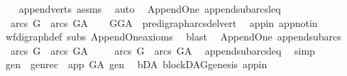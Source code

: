 \begin{isabellebody}
%
\isadelimproof
\ \ %
\endisadelimproof
%
\isatagproof
{}\isamarkupfalse%
\ append{\isacharunderscore}{\kern0pt}verts\ assms\ \isamarkupfalse%
\ auto%
\endisatagproof
{\isafoldproof}%
%
\isadelimproof
\isanewline
%
\endisadelimproof
\isanewline
{}\isamarkupfalse%
\ {\isacharparenleft}{\kern0pt}\ Append{\isacharunderscore}{\kern0pt}One{\isacharparenright}{\kern0pt}\ append{\isacharunderscore}{\kern0pt}subarcs{\isacharunderscore}{\kern0pt}leq{\isacharcolon}{\kern0pt}\ \isanewline
\ \ {\isachardoublequoteopen}arcs\ G\ {\isasymsubseteq}\ arcs\ G{\isacharunderscore}{\kern0pt}A{\isachardoublequoteclose}\isanewline
%
\isadelimproof
\ \ %
\endisadelimproof
%
\isatagproof
{}\isamarkupfalse%
\ GG{\isacharunderscore}{\kern0pt}A\ \ pre{\isacharunderscore}{\kern0pt}digraph{\isachardot}{\kern0pt}arcs{\isacharunderscore}{\kern0pt}del{\isacharunderscore}{\kern0pt}vert\ \isamarkupfalse%
\ app{\isacharunderscore}{\kern0pt}in\ app{\isacharunderscore}{\kern0pt}notin\ \isanewline
\ \ \isamarkupfalse%
\ wf{\isacharunderscore}{\kern0pt}digraph{\isacharunderscore}{\kern0pt}def\ subs\ Append{\isacharunderscore}{\kern0pt}One{\isacharunderscore}{\kern0pt}axioms\ \isamarkupfalse%
\ blast%
\endisatagproof
{\isafoldproof}%
%
\isadelimproof
\isanewline
%
\endisadelimproof
\isanewline
{}\isamarkupfalse%
\ {\isacharparenleft}{\kern0pt}\ Append{\isacharunderscore}{\kern0pt}One{\isacharparenright}{\kern0pt}\ append{\isacharunderscore}{\kern0pt}subarcs{\isacharcolon}{\kern0pt}\ \isanewline
\ \ {\isachardoublequoteopen}arcs\ G\ {\isasymsubset}\ arcs\ G{\isacharunderscore}{\kern0pt}A{\isachardoublequoteclose}\isanewline
%
\isadelimproof
%
\endisadelimproof
%
\isatagproof
{}\isamarkupfalse%
\isanewline
\ \ \isamarkupfalse%
\ \ {\isachardoublequoteopen}arcs\ G\ {\isasymsubseteq}\ arcs\ G{\isacharunderscore}{\kern0pt}A{\isachardoublequoteclose}\ \isamarkupfalse%
\ append{\isacharunderscore}{\kern0pt}subarcs{\isacharunderscore}{\kern0pt}leq\ \isamarkupfalse%
\ simp\isanewline
\ \ \isamarkupfalse%
\ gen\ \ gen{\isacharunderscore}{\kern0pt}rec{\isacharcolon}{\kern0pt}\ {\isachardoublequoteopen}\ app\ {\isasymrightarrow}\isactrlsup {\isacharplus}{\kern0pt}\isactrlbsub G{\isacharunderscore}{\kern0pt}A\isactrlesub \ gen{\isachardoublequoteclose}\ \isamarkupfalse%
\ bD{\isacharunderscore}{\kern0pt}A\ blockDAG{\isachardot}{\kern0pt}genesis\ app{\isacharunderscore}{\kern0pt}in\isanewline

\end{isabellebody}
